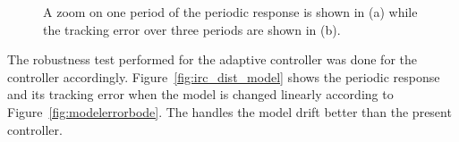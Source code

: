 \begin{figure}[h!]
  \centering %
  \qquad
  \caption{\label{fig:irc_tracking} A zoom on one period of the periodic response is shown in (a) while the tracking error over three periods are shown in (b).}
\end{figure}

The robustness test performed for the adaptive controller was done for the \abbrIRC controller accordingly. Figure~\ref{fig:irc_dist_model} shows the periodic response and its tracking error when the model is changed linearly according to Figure~\ref{fig:modelerrorbode}. The \abbrIRC handles the model drift better than the present controller.

